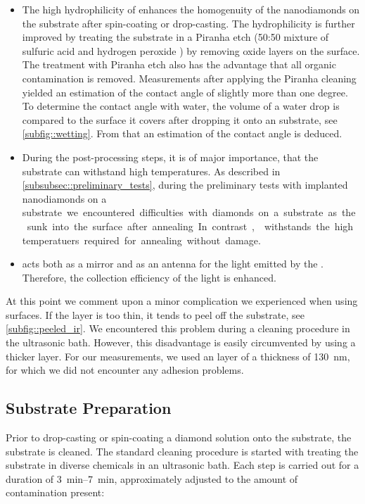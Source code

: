 	\begin{itemize}
		\item The high hydrophilicity of \ir enhances the homogenuity of the nanodiamonds on the substrate after spin-coating or drop-casting.
		The hydrophilicity is further improved by treating the substrate in a Piranha etch (50:50 mixture of sulfuric acid  and hydrogen peroxide ) by removing oxide layers on the surface.
		The treatment with Piranha etch also has the advantage that all organic contamination is removed.
		Measurements after applying the Piranha cleaning yielded an estimation of the contact angle of slightly more than one degree.
		To determine the contact angle with water, the volume of a water drop is compared to the surface it covers after dropping it onto an \ir substrate, see \autoref{subfig::wetting}.	From that an estimation of the contact angle is deduced.
		\item During the post-processing steps, it is of major importance, that the substrate can withstand high temperatures.
		As described in \autoref{subsubsec::preliminary_tests}, during the preliminary tests with implanted nanodiamonds on a \si substrate we encountered difficulties with diamonds on a \si substrate as the sunk into the surface after annealing.
		In contrast, \ir withstands the high temperatuers required for annealing without damage.
		\item \Ir acts both as a mirror and as an antenna for the \fl light emitted by the \siv \cite{Neu2012a}.
		Therefore, the collection efficiency of the \fl light is enhanced.
	\end{itemize}

	At this point we comment upon a minor complication we experienced when using \ir surfaces.
	If the \ir layer is too thin, it tends to peel off the substrate, see \autoref{subfig::peeled_ir}.
	We encountered this problem during a cleaning procedure in the ultrasonic bath.
	However, this disadvantage is easily circumvented by using a thicker \ir layer.
	For our measurements, we used an \ir layer of a thickness of \SI{130}{nm}, for which we did not encounter any adhesion problems.

	\subsection{Substrate Preparation}

	Prior to drop-casting or spin-coating a diamond solution onto the \ir substrate, the substrate is cleaned. 
	The standard cleaning procedure is started with treating the substrate in diverse chemicals in an ultrasonic bath. 
	Each step is carried out for a duration of \SIrange{3}{7}{\minute}, approximately adjusted to the amount of contamination present:

